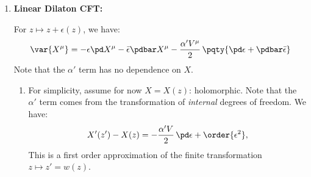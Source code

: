 \documentclass[a4paper,10pt]{article}
\begin{document}
\begin{enumerate}
\begin{enumerate}
	\end{enumerate}
	
	\item \textbf{Linear Dilaton CFT:}
	
	For $z\mapsto z + \epsilon(z)$, we have:
	\begin{equation}
		\var{X^\mu}
		= - \epsilon\pd X^\mu
			- \bar{\epsilon}\pdbar X^\mu
			- \frac{\alpha'V^\mu}{2}\,\pqty{
				\pd\epsilon
				+ \pdbar\bar{\epsilon}
			}
	\end{equation}
	Note that the $\alpha'$ term has no dependence on $X$. 
	
	\begin{enumerate}
	\item For simplicity, assume for now $X = X(z)$: holomorphic. Note that the $\alpha'$ term comes from the transformation of \textit{internal} degrees of freedom. We have:
	\begin{gather}
		X'(z') - X(z)
		= -\frac{\alpha' V}{2}\,\pd\epsilon
			+ \order{\epsilon^2},
		\label{eq:dilaton_holomorphic}
	\end{gather}
	This is a first order approximation of the finite transformation $z\mapsto z' = w(z)$. 
	

\end{enumerate}
\end{enumerate}
\end{document}
